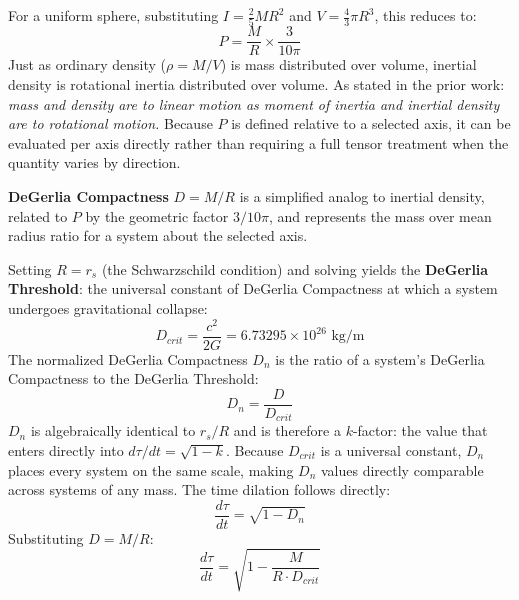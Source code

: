 For a uniform sphere, substituting $I = \frac{2}{5}MR^2$ and $V = \frac{4}{3}\pi R^3$, this reduces to:
\begin{equation}
P = \frac{M}{R} \times \frac{3}{10\pi}
\end{equation}
Just as ordinary density ($\rho = M/V$) is mass distributed over volume, inertial density is rotational inertia distributed over volume. As stated in the prior work: \textit{mass and density are to linear motion as moment of inertia and inertial density are to rotational motion.} Because $P$ is defined relative to a selected axis, it can be evaluated per axis directly rather than requiring a full tensor treatment when the quantity varies by direction.

\textbf{DeGerlia Compactness} $D = M/R$ is a simplified analog to inertial density, related to $P$ by the geometric factor $3/10\pi$, and represents the mass over mean radius ratio for a system about the selected axis.

Setting $R = r_s$ (the Schwarzschild condition) \citep{schwarzschild1916radius} and solving yields the \textbf{DeGerlia Threshold}: the universal constant of DeGerlia Compactness at which a system undergoes gravitational collapse:
\begin{equation}
D_{crit} = \frac{c^2}{2G} = 6.73295 \times 10^{26} \text{ kg/m}
\end{equation}
The normalized DeGerlia Compactness $D_n$ is the ratio of a system's DeGerlia Compactness to the DeGerlia Threshold:
\begin{equation}
D_n = \frac{D}{D_{crit}}
\end{equation}
$D_n$ is algebraically identical to $r_s/R$ and is therefore a $k$-factor: the value that enters directly into $d\tau/dt = \sqrt{1-k}$. Because $D_{crit}$ is a universal constant, $D_n$ places every system on the same scale, making $D_n$ values directly comparable across systems of any mass. The time dilation follows directly:
\begin{equation}
\frac{d\tau}{dt} = \sqrt{1 - D_n}
\end{equation}
Substituting $D = M/R$:
\begin{equation}
\frac{d\tau}{dt} = \sqrt{1 - \frac{M}{R \cdot D_{crit}}}
\end{equation}

